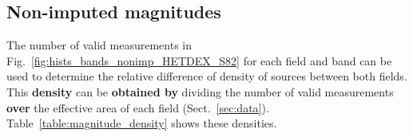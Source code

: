 \documentclass{aa}
\begin{document}
\begin{appendix}
\section{Non-imputed magnitudes}\label{sec:app_nonimputed_mag_dist}

The number of valid measurements in Fig.~\ref{fig:hists_bands_nonimp_HETDEX_S82} for each field and band can be used to determine the relative difference of density of sources between both fields. This \textbf{density} can be \textbf{obtained by} dividing the number of valid measurements \textbf{over} the effective area of each field (Sect.~\ref{sec:data}). Table~\ref{table:magnitude_density} shows these densities.

\begin{table}
\setlength{\tabcolsep}{2.9pt}
\caption{Density of detected sources (in units of sources per square degree) per band and field.}             %
\label{table:magnitude_density}      %
\centering                          %
\end{table}



\end{appendix}
\end{document}
